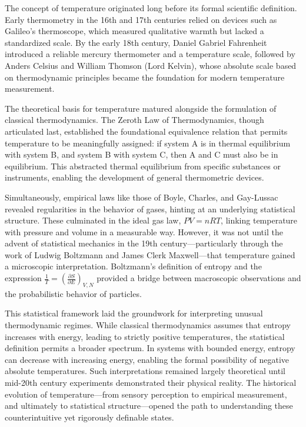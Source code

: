 \begin{historical}
The concept of temperature originated long before its formal scientific definition. Early thermometry in the 16th and 17th centuries relied on devices such as Galileo’s thermoscope, which measured qualitative warmth but lacked a standardized scale. By the early 18th century, Daniel Gabriel Fahrenheit introduced a reliable mercury thermometer and a temperature scale, followed by Anders Celsius and William Thomson (Lord Kelvin), whose absolute scale based on thermodynamic principles became the foundation for modern temperature measurement.

The theoretical basis for temperature matured alongside the formulation of classical thermodynamics. The Zeroth Law of Thermodynamics, though articulated last, established the foundational equivalence relation that permits temperature to be meaningfully assigned: if system A is in thermal equilibrium with system B, and system B with system C, then A and C must also be in equilibrium. This abstracted thermal equilibrium from specific substances or instruments, enabling the development of general thermometric devices.

Simultaneously, empirical laws like those of Boyle, Charles, and Gay-Lussac revealed regularities in the behavior of gases, hinting at an underlying statistical structure. These culminated in the ideal gas law, \( PV = nRT \), linking temperature with pressure and volume in a measurable way. However, it was not until the advent of statistical mechanics in the 19th century—particularly through the work of Ludwig Boltzmann and James Clerk Maxwell—that temperature gained a microscopic interpretation. Boltzmann’s definition of entropy and the expression \( \frac{1}{T} = \left(\frac{\partial S}{\partial E}\right)_{V,N} \) provided a bridge between macroscopic observations and the probabilistic behavior of particles.

This statistical framework laid the groundwork for interpreting unusual thermodynamic regimes. While classical thermodynamics assumes that entropy increases with energy, leading to strictly positive temperatures, the statistical definition permits a broader spectrum. In systems with bounded energy, entropy can decrease with increasing energy, enabling the formal possibility of negative absolute temperatures. Such interpretations remained largely theoretical until mid-20th century experiments demonstrated their physical reality. The historical evolution of temperature—from sensory perception to empirical measurement, and ultimately to statistical structure—opened the path to understanding these counterintuitive yet rigorously definable states.
\end{historical}
